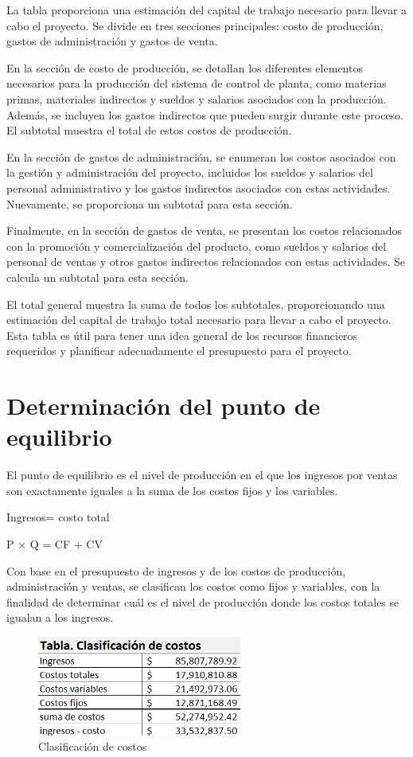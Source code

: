 La tabla proporciona una estimación del capital de trabajo necesario para llevar a cabo el proyecto. Se divide en tres secciones principales: costo de producción, gastos de administración y gastos de venta.

En la sección de costo de producción, se detallan los diferentes elementos necesarios para la producción del sistema de control de planta, como materias primas, materiales indirectos y sueldos y salarios asociados con la producción. Además, se incluyen los gastos indirectos que pueden surgir durante este proceso. El subtotal muestra el total de estos costos de producción.

En la sección de gastos de administración, se enumeran los costos asociados con la gestión y administración del proyecto, incluidos los sueldos y salarios del personal administrativo y los gastos indirectos asociados con estas actividades. Nuevamente, se proporciona un subtotal para esta sección.

Finalmente, en la sección de gastos de venta, se presentan los costos relacionados con la promoción y comercialización del producto, como sueldos y salarios del personal de ventas y otros gastos indirectos relacionados con estas actividades. Se calcula un subtotal para esta sección.

El total general muestra la suma de todos los subtotales, proporcionando una estimación del capital de trabajo total necesario para llevar a cabo el proyecto. Esta tabla es útil para tener una idea general de los recursos financieros requeridos y planificar adecuadamente el presupuesto para el proyecto.


\section{Determinación del punto de equilibrio}

El punto de equilibrio es el nivel de producción en el que los ingresos por ventas son exactamente iguales a la suma de los costos fijos y los variables.

Ingresos= costo total

P × Q = CF + CV

Con base en el presupuesto de ingresos y de los costos de producción, administración y ventas, se clasifican los costos como fijos y variables, con la finalidad de determinar cuál es el nivel de producción donde los costos totales se igualan a los ingresos.


\begin{figure}[H]
    \centering	
    \includegraphics[width=0.6\textwidth]{chapters/ELC_PUNTO2.png} 
    \caption{Clasificación de costos}
\label{fig:croquis190125}
\end{figure}

